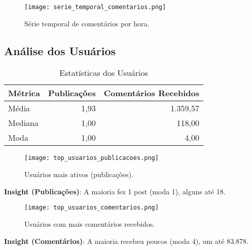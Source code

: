 \documentclass[a4paper]{article}
\begin{document}
\begin{figure}[htbp]
    \centering
    \texttt{[image: serie\_temporal\_comentarios.png]}
    \caption{Série temporal de comentários por hora.}
\end{figure}

\subsection{Análise dos Usuários}
\begin{table}[htbp]
    \centering
    \caption{Estatísticas dos Usuários}
    \begin{tabular}{lrr}
        \toprule
        \textbf{Métrica} & \textbf{Publicações} & \textbf{Comentários Recebidos} \\
        \midrule
        Média & 1,93 & 1.359,57 \\
        Mediana & 1,00 & 118,00 \\
        Moda & 1,00 & 4,00 \\
        \bottomrule
    \end{tabular}
\end{table}

\begin{figure}[htbp]
    \centering
    \texttt{[image: top\_usuarios\_publicacoes.png]}
    \caption{Usuários mais ativos (publicações).}
\end{figure}

\textbf{Insight (Publicações)}: A maioria fez 1 post (moda 1), alguns até 18.

\begin{figure}[htbp]
    \centering
    \texttt{[image: top\_usuarios\_comentarios.png]}
    \caption{Usuários com mais comentários recebidos.}
\end{figure}

\textbf{Insight (Comentários)}: A maioria recebeu poucos (moda 4), um até 83.878.
\end{document}
